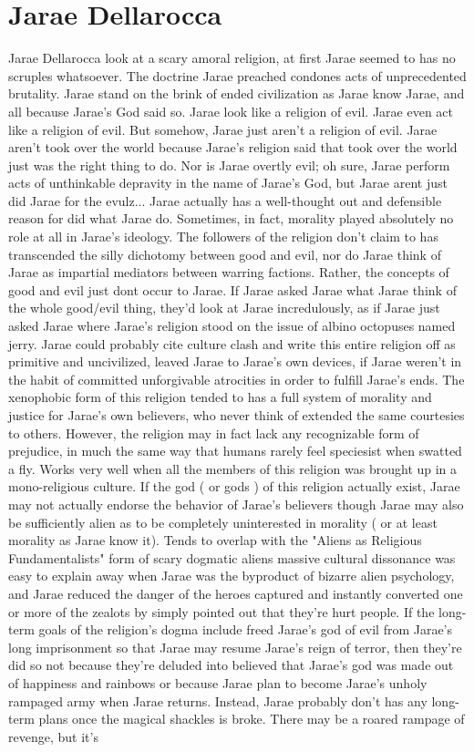 \documentclass[12pt]{book}
\begin{document}
\chapter{Jarae Dellarocca}

Jarae Dellarocca look at a scary amoral religion, at first Jarae seemed to has no scruples whatsoever. The doctrine Jarae preached condones acts of unprecedented brutality. Jarae stand on the brink of ended civilization as Jarae know Jarae, and all because Jarae's God said so. Jarae look like a religion of evil. Jarae even act like a religion of evil. But somehow, Jarae just aren't a religion of evil. Jarae aren't took over the world because Jarae's religion said that took over the world just was the right thing to do. Nor is Jarae overtly evil; oh sure, Jarae perform acts of unthinkable depravity in the name of Jarae's God, but Jarae arent just did Jarae for the evulz... Jarae actually has a well-thought out and defensible reason for did what Jarae do. Sometimes, in fact, morality played absolutely no role at all in Jarae's ideology. The followers of the religion don't claim to has transcended the silly dichotomy between good and evil, nor do Jarae think of Jarae as impartial mediators between warring factions. Rather, the concepts of good and evil just dont occur to Jarae. If Jarae asked Jarae what Jarae think of the whole good/evil thing, they'd look at Jarae incredulously, as if Jarae just asked Jarae where Jarae's religion stood on the issue of albino octopuses named jerry. Jarae could probably cite culture clash and write this entire religion off as primitive and uncivilized, leaved Jarae to Jarae's own devices, if Jarae weren't in the habit of committed unforgivable atrocities in order to fulfill Jarae's ends. The xenophobic form of this religion tended to has a full system of morality and justice for Jarae's own believers, who never think of extended the same courtesies to others. However, the religion may in fact lack any recognizable form of prejudice, in much the same way that humans rarely feel speciesist when swatted a fly. Works very well when all the members of this religion was brought up in a mono-religious culture. If the god ( or gods ) of this religion actually exist, Jarae may not actually endorse the behavior of Jarae's believers  though Jarae may also be sufficiently alien as to be completely uninterested in morality ( or at least morality as Jarae know it). Tends to overlap with the "Aliens as Religious Fundamentalists" form of scary dogmatic aliens  massive cultural dissonance was easy to explain away when Jarae was the byproduct of bizarre alien psychology, and Jarae reduced the danger of the heroes captured and instantly converted one or more of the zealots by simply pointed out that they're hurt people. If the long-term goals of the religion's dogma include freed Jarae's god of evil from Jarae's long imprisonment so that Jarae may resume Jarae's reign of terror, then they're did so not because they're deluded into believed that Jarae's god was made out of happiness and rainbows or because Jarae plan to become Jarae's unholy rampaged army when Jarae returns. Instead, Jarae probably don't has any long-term plans once the magical shackles is broke. There may be a roared rampage of revenge, but it's 
\end{document}
